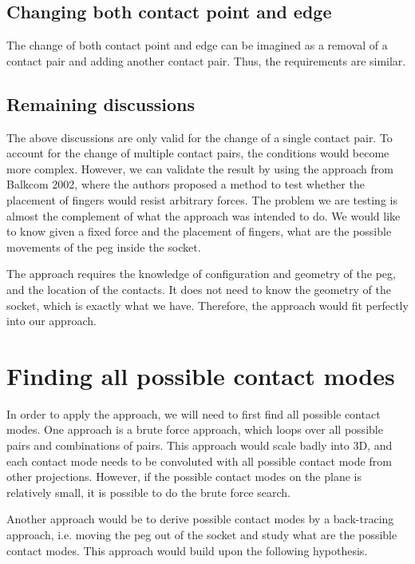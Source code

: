 \documentclass[11p]{article}
\begin{document}
\subsection{Changing both contact point and edge}

The change of both contact point and edge can be imagined as a removal of a contact pair and adding another contact pair. Thus, the requirements are similar. 

\subsection{Remaining discussions}

The above discussions are only valid for the change of a single contact pair. To account for the change of multiple contact pairs, the conditions would become more complex. However, we can validate the result by using the approach from Balkcom 2002, where the authors proposed a method to test whether the placement of fingers would resist arbitrary forces. The problem we are testing is almost the complement of what the approach was intended to do. We would like to know given a fixed force and the placement of fingers, what are the possible movements of the peg inside the socket. 

The approach requires the knowledge of configuration and geometry of the peg, and the location of the contacts. It does not need to know the geometry of the socket, which is exactly what we have. Therefore, the approach would fit perfectly into our approach. 

\section{Finding all possible contact modes}

In order to apply the approach, we will need to first find all possible contact modes. One approach is a brute force approach, which loops over all possible pairs and combinations of pairs. This approach would scale badly into 3D, and each contact mode needs to be convoluted with all possible contact mode from other projections. However, if the possible contact modes on the plane is relatively small, it is possible to do the brute force search. 

Another approach would be to derive possible contact modes by a back-tracing approach, i.e. moving the peg out of the socket and study what are the possible contact modes. This approach would build upon the following hypothesis. 
\end{document}

